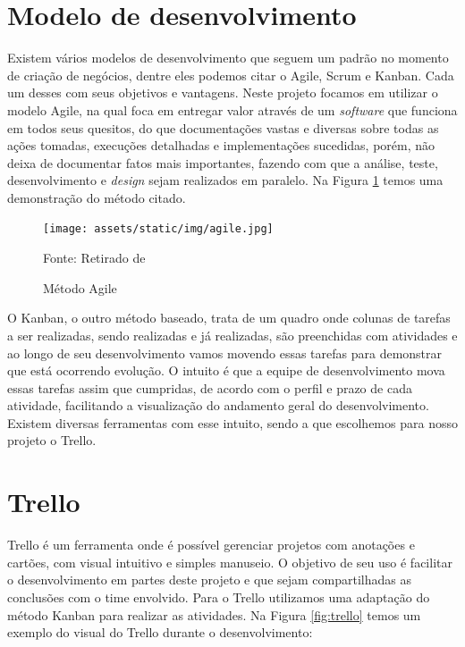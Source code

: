 \documentclass[../../layout.tex]{subfiles}
\begin{document}
\section{Modelo de desenvolvimento}
Existem vários modelos de desenvolvimento que seguem um padrão no momento de criação de negócios, dentre eles podemos citar o Agile, Scrum e Kanban. Cada um desses com seus objetivos e vantagens. Neste projeto focamos em utilizar o modelo Agile, na qual foca em entregar valor através de um \emph{software} que funciona em todos seus quesitos, do que documentações vastas e diversas sobre todas as ações tomadas, execuções detalhadas e implementações sucedidas, porém, não deixa de documentar fatos mais importantes, fazendo com que a análise, teste, desenvolvimento e \emph{design} sejam realizados em paralelo. Na Figura \ref{fig:agile} temos uma demonstração do método citado.

\begin{figure}[H]
\centering
\caption{Método Agile}
\texttt{[image: assets/static/img/agile.jpg]}
\label{fig:agile}

\begin{minipage}{0.5\textwidth}
\raggedright \footnotesize Fonte: Retirado de \cite{agile}
\end{minipage}
\end{figure}

O Kanban, o outro método baseado, trata de um quadro onde colunas de tarefas a ser realizadas, sendo realizadas e já realizadas, são preenchidas com atividades e ao longo de seu desenvolvimento vamos movendo essas tarefas para demonstrar que está ocorrendo evolução. O intuito é que a equipe de desenvolvimento mova essas tarefas assim que cumpridas, de acordo com o perfil e prazo de cada atividade, facilitando a visualização do andamento geral do desenvolvimento. Existem diversas ferramentas com esse intuito, sendo a que escolhemos para nosso projeto o Trello.

\section{Trello}
Trello é um ferramenta onde é possível gerenciar projetos com anotações e cartões, com visual intuitivo e simples manuseio. O objetivo de seu uso é facilitar o desenvolvimento em partes deste projeto e que sejam compartilhadas as conclusões com o time envolvido. Para o Trello utilizamos uma adaptação do método Kanban para realizar as atividades. Na Figura \ref{fig:trello} temos um exemplo do visual do Trello durante o desenvolvimento:
\end{document}
